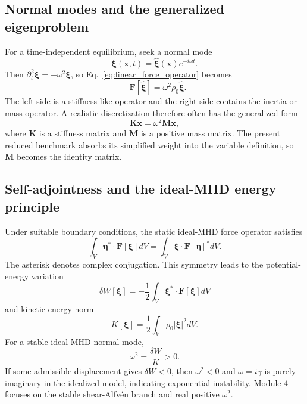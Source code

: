 \subsection{Normal modes and the generalized eigenproblem}
For a time-independent equilibrium, seek a normal mode
\begin{equation}
\boldsymbol\xi(\mathbf x,t)=\widehat{\boldsymbol\xi}(\mathbf x)e^{-i\omega t}.
\label{eq:normal_mode_ansatz}
\end{equation}
Then $\partial_t^2\boldsymbol\xi=-\omega^2\boldsymbol\xi$, so Eq.~\eqref{eq:linear_force_operator} becomes
\begin{equation}
-\mathbf F[\widehat{\boldsymbol\xi}]=\omega^2\rho_0\widehat{\boldsymbol\xi}.
\label{eq:full_mhd_eigenproblem}
\end{equation}
The left side is a stiffness-like operator and the right side contains the inertia or mass operator. A realistic discretization therefore often has the generalized form
\begin{equation}
\mathbf K\mathbf x=\omega^2\mathbf M\mathbf x,
\label{eq:generalized_discrete_mhd}
\end{equation}
where $\mathbf K$ is a stiffness matrix and $\mathbf M$ is a positive mass matrix. The present reduced benchmark absorbs its simplified weight into the variable definition, so $\mathbf M$ becomes the identity matrix.

\subsection{Self-adjointness and the ideal-MHD energy principle}
Under suitable boundary conditions, the static ideal-MHD force operator satisfies
\begin{equation}
\int_V\boldsymbol\eta^*\cdot\mathbf F[\boldsymbol\xi]dV
=
\int_V\boldsymbol\xi\cdot\mathbf F[\boldsymbol\eta]^*dV.
\label{eq:self_adjoint_force}
\end{equation}
The asterisk denotes complex conjugation. This symmetry leads to the potential-energy variation
\begin{equation}
\delta W[\boldsymbol\xi]
=-\frac{1}{2}\int_V\boldsymbol\xi^*\cdot\mathbf F[\boldsymbol\xi]dV
\end{equation}
and kinetic-energy norm
\begin{equation}
K[\boldsymbol\xi]=\frac{1}{2}\int_V\rho_0|\boldsymbol\xi|^2dV.
\end{equation}
For a stable ideal-MHD normal mode,
\begin{equation}
\omega^2=\frac{\delta W}{K}>0.
\label{eq:full_rayleigh}
\end{equation}
If some admissible displacement gives $\delta W<0$, then $\omega^2<0$ and $\omega=i\gamma$ is purely imaginary in the idealized model, indicating exponential instability. Module 4 focuses on the stable shear-Alfv\'en branch and real positive $\omega^2$.

